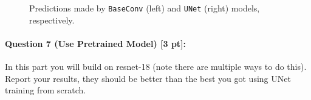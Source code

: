 \documentclass[11pt]{article}
\begin{document}
\begin{figure}[h]
    \centering
    \qquad
    \caption{Predictions made by \texttt{BaseConv} (left) and \texttt{UNet} (right) models, respectively.}
    \label{fig:pred-BaseConv-UNet]}
\end{figure}


\paragraph{Question 7 (Use Pretrained Model) [3 pt]:} 
In this part you will build on resnet-18 (note there are multiple ways to do this). Report your results, they should be better than the best you got using UNet training from scratch.
\end{document}
